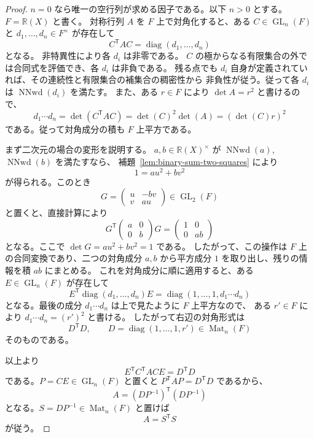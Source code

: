 \documentclass[uplatex,dvipdfmx]{jsarticle}
\newcommand{\Frac}{\mathbb{R}(X)}
\newcommand{\Mat}{\operatorname{Mat}}
\newcommand{\NNwd}{\operatorname{NNwd}}
\theoremstyle{matrixsosdefinition}
\begin{document}
\begin{proof}
  \(n=0\) なら唯一の空行列が求める因子である。以下 \(n>0\) とする。
  \(F=\Frac\) と書く。
  対称行列 \(A\) を \(F\) 上で対角化すると、ある
  \(C\in\operatorname{GL}_n(F)\) と \(d_1,\ldots,d_n\in F^\times\) が存在して
  \[
    C^{\mathsf T}AC=\operatorname{diag}(d_1,\ldots,d_n)
  \]
  となる。
  非特異性により各 \(d_i\) は非零である。
  \(C\) の極からなる有限集合の外では合同式を評価でき、各 \(d_i\) は非負である。
  残る点でも \(d_i\) 自身が定義されていれば、その連続性と有限集合の補集合の稠密性から
  非負性が従う。従って各 \(d_i\) は \(\NNwd(d_i)\) を満たす。
  また、ある \(r\in F\) により \(\det A=r^2\) と書けるので、
  \[
    d_1\cdots d_n
    =\det(C^{\mathsf T}AC)
    =\det(C)^2\det(A)
    =(\det(C)r)^2
  \]
  である。従って対角成分の積も \(F\) 上平方である。

  まず二次元の場合の変形を説明する。
  \(a,b\in\Frac^\times\) が \(\NNwd(a)\), \(\NNwd(b)\) を満たすなら、
  補題~\ref{lem:binary-sum-two-squares} により
  \[
    1=a u^2+b v^2
  \]
  が得られる。このとき
  \[
    G=
    \begin{pmatrix}u&-bv\\ v&au\end{pmatrix}\in\operatorname{GL}_2(F)
  \]
  と置くと、直接計算により
  \[
    G^{\mathsf T}
    \begin{pmatrix}a&0\\0&b\end{pmatrix}
    G
    =
    \begin{pmatrix}1&0\\0&ab\end{pmatrix}
  \]
  となる。ここで \(\det G=a u^2+b v^2=1\) である。
  したがって、この操作は \(F\) 上の合同変換であり、二つの対角成分
  \(a,b\) から平方成分 \(1\) を取り出し、残りの情報を積 \(ab\) にまとめる。
  これを対角成分に順に適用すると、ある \(E\in\operatorname{GL}_n(F)\) が存在して
  \[
    E^{\mathsf T}\operatorname{diag}(d_1,\ldots,d_n)E
    =
    \operatorname{diag}(1,\ldots,1,d_1\cdots d_n)
  \]
  となる。最後の成分 \(d_1\cdots d_n\) は上で見たように \(F\) 上平方なので、
  ある \(r'\in F\) により \(d_1\cdots d_n=(r')^2\) と書ける。
  したがって右辺の対角形式は
  \[
    D^{\mathsf T}D,\qquad
    D=\operatorname{diag}(1,\ldots,1,r')\in\Mat_n(F)
  \]
  そのものである。

  以上より
  \[
    E^{\mathsf T}C^{\mathsf T}ACE=D^{\mathsf T}D
  \]
  である。\(P=CE\in\operatorname{GL}_n(F)\) と置くと
  \(P^{\mathsf T}AP=D^{\mathsf T}D\) であるから、
  \[
    A=(DP^{-1})^{\mathsf T}(DP^{-1})
  \]
  となる。\(S=DP^{-1}\in\Mat_n(F)\) と置けば
  \[
    A=S^{\mathsf T}S
  \]
  が従う。
\end{proof}
\end{document}
